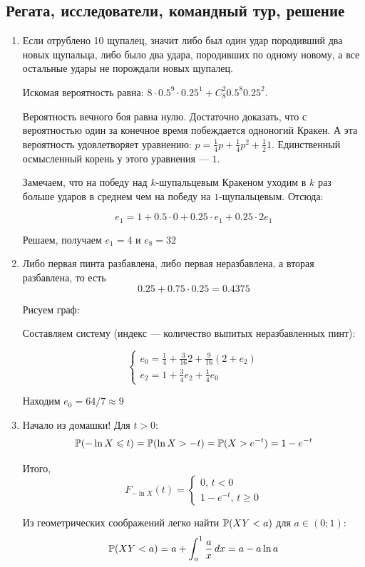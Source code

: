 \documentclass[12pt, a4paper]{article}\usepackage[]{graphicx}\usepackage[]{color}
\begin{document}
\subsection{Регата, исследователи, командный тур, решение}

\begin{enumerate}

\item Если отрублено 10 щупалец, значит либо был один удар породивший два новых щупальца, либо было два удара, породивших по одному новому, а все остальные удары не порождали новых щупалец.

Искомая вероятность равна: $8\cdot 0.5^9 \cdot 0.25^1 + C_8^2 0.5^8 0.25^2$.

Вероятность вечного боя равна нулю. Достаточно доказать, что с вероятностью один за конечное время побеждается одноногий Кракен. А эта вероятность удовлетворяет уравнению: $p=\frac{1}{4}p + \frac{1}{4}p^2 + \frac{1}{2} 1$. Единственный осмысленный корень у этого уравнения — $1$.

Замечаем, что на победу над $k$-шупальцевым Кракеном уходим в $k$ раз больше ударов в среднем чем на победу на $1$-щупальцевым. Отсюда:

\[
e_1=1 + 0.5\cdot 0 + 0.25\cdot e_1 + 0.25 \cdot 2e_1
\]

Решаем, получаем $e_1=4$ и $e_8=32$

\item Либо первая пинта разбавлена, либо первая неразбавлена, а вторая разбавлена, то есть
\[
0.25 + 0.75\cdot 0.25 =0.4375
\]

Рисуем граф:


Составляем систему (индекс — количество выпитых неразбавленных пинт):

\[
\begin{cases}
e_0=\frac{1}{4} + \frac{3}{16}2 + \frac{9}{16}(2+e_2) \\
e_2=1+\frac{3}{4}e_2 + \frac{1}{4}e_0
\end{cases}
\]

Находим $e_0=64/7\approx 9$

\item Начало из домашки! Для $t>0$:
\[
\P(-\ln X \leq t)=\P(\ln X > -t)=\P(X > e^{-t})=1-e^{-t}
\]

Итого,
\[
F_{-\ln X}(t)=\begin{cases}
0, \, t < 0 \\
1-e^{-t}, \, t \geq 0
\end{cases}
\]

Из геометрических соображений легко найти $\P(XY < a)$ для $a\in (0;1)$:
\[
\P(XY < a)=a + \int_a^1 \frac{a}{x} \, dx=a-a\ln a
\]


\end{enumerate}
\end{document}
